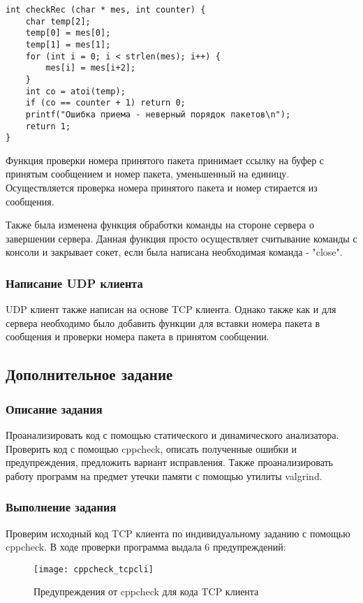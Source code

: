 \begin{lstlisting}
int checkRec (char * mes, int counter) {
    char temp[2];
    temp[0] = mes[0];
    temp[1] = mes[1];
    for (int i = 0; i < strlen(mes); i++) {
        mes[i] = mes[i+2];
    }
    int co = atoi(temp);
    if (co == counter + 1) return 0;
    printf("Ошибка приема - неверный порядок пакетов\n");
    return 1;
}
\end{lstlisting}
Функция проверки номера принятого пакета принимает ссылку на буфер с принятым сообщением и номер пакета, уменьшенный на единицу. Осуществляется проверка номера принятого пакета и номер стирается из сообщения.

Также была изменена функция обработки команды на стороне сервера о завершении сервера. Данная функция просто осуществляет считывание команды с консоли и закрывает сокет, если была написана необходимая команда - "close".

\subsubsection{Написание UDP клиента}
UDP клиент также написан на основе TCP клиента. Однако также как и для сервера необходимо было добавить функции для вставки номера пакета в сообщения и проверки номера пакета в принятом сообщении. 

\subsection{Дополнительное задание}
\subsubsection{Описание задания}
Проанализировать код с помощью статического и динамического анализатора. Проверить код с помощью cppcheck, описать полученные ошибки и предупреждения, предложить вариант исправления. Также проанализировать работу программ на предмет утечки памяти с помощью утилиты valgrind.

\subsubsection{Выполнение задания}
Проверим исходный код TCP клиента по индивидуальному заданию с помощью cppcheck.
В ходе проверки программа выдала 6 предупреждений:
\begin{figure}[H]
	\begin{center}
		\texttt{[image: cppcheck\_tcpcli]}
		\caption{Предупреждения от cppcheck для кода TCP клиента} 
		\label{pic:cppcheck1} %
	\end{center}
\end{figure}

